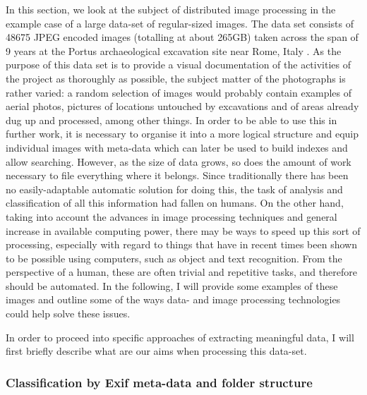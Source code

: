\documentclass [12pt,a4paper]{report}
\begin{document}
In this section, we look at the subject of distributed image processing in the example case of a large data-set of regular-sized images. The data set consists of 48675 JPEG encoded images (totalling at about 265GB) taken across the span of 9 years at the Portus archaeological excavation site near Rome, Italy \cite{portusproject}. As the purpose of this data set is to provide a visual documentation of the activities of the project as thoroughly as possible, the subject matter of the photographs is rather varied: a random selection of images would probably contain examples of aerial photos, pictures of locations untouched by excavations and of areas already dug up and processed, among other things. In order to be able to use this in further work, it is necessary to organise it into a more logical structure and equip individual images with meta-data which can later be used to build indexes and allow searching. However, as the size of data grows, so does the amount of work necessary to file everything where it belongs. 
Since traditionally there has been no easily-adaptable automatic solution for doing this, the task of analysis and classification of all this information had fallen on humans. On the other hand, taking into account the advances in image processing techniques and general increase in available computing power, there may be ways to speed up this sort of processing, especially with regard to things that have in recent times been shown to be possible using computers, such as object and text recognition. From the perspective of a human, these are often trivial and repetitive tasks, and therefore should be automated. In the following, I will provide some examples of these images and outline some of the ways data- and image processing technologies could help solve these issues.

In order to proceed into specific approaches of extracting meaningful data, I will first briefly describe what are our aims when processing this data-set. 

\subsubsection{Classification by Exif meta-data and folder structure}
\end{document}
